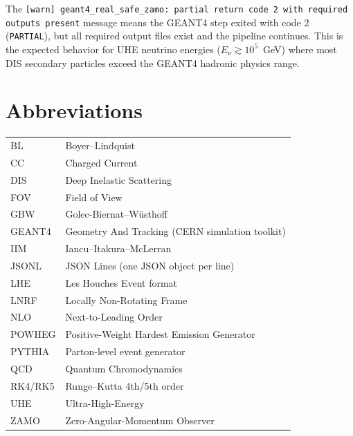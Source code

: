 \documentclass[11pt,a4paper]{article}
\begin{document}
The \texttt{[warn] geant4\_real\_safe\_zamo: partial return code 2 with required outputs present} message means the GEANT4 step exited with code 2 (\texttt{PARTIAL}), but all required output files exist and the pipeline continues. This is the expected behavior for UHE neutrino energies ($E_\nu \gtrsim 10^5$~GeV) where most DIS secondary particles exceed the GEANT4 hadronic physics range.

\section*{Abbreviations}

\begin{tabular}{ll}
BL & Boyer--Lindquist \\
CC & Charged Current \\
DIS & Deep Inelastic Scattering \\
FOV & Field of View \\
GBW & Golec-Biernat--W\"{u}sthoff \\
GEANT4 & Geometry And Tracking (CERN simulation toolkit) \\
IIM & Iancu--Itakura--McLerran \\
JSONL & JSON Lines (one JSON object per line) \\
LHE & Les Houches Event format \\
LNRF & Locally Non-Rotating Frame \\
NLO & Next-to-Leading Order \\
POWHEG & Positive-Weight Hardest Emission Generator \\
PYTHIA & Parton-level event generator \\
QCD & Quantum Chromodynamics \\
RK4/RK5 & Runge--Kutta 4th/5th order \\
UHE & Ultra-High-Energy \\
ZAMO & Zero-Angular-Momentum Observer \\
\end{tabular}
\end{document}
